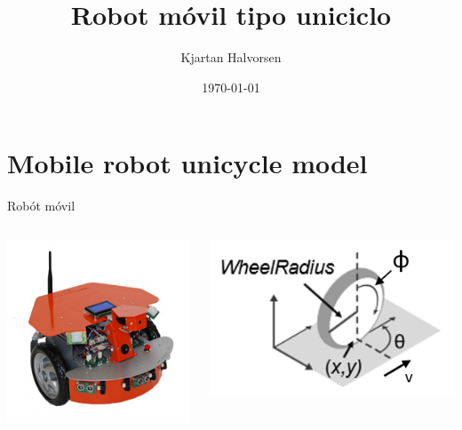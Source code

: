 \documentclass[presentation,aspectratio=169]{beamer}
\author{Kjartan Halvorsen}
\date{\today}
\title{Robot móvil tipo uniciclo}
\begin{document}
\maketitle

\section{Mobile robot unicycle model}
\label{sec:orgfd83bbd}

\begin{frame}[label={sec:org091a4ba}]{Robót móvil}
\begin{columns}
\begin{column}{0.4\columnwidth}
\begin{center}
 \includegraphics[width=.8\linewidth]{../figures/X80Pro.jpg}
\end{center}
\end{column}




\begin{column}{0.4\columnwidth}
\begin{center}
 \includegraphics[width=1.0\linewidth]{../figures/unicycle_annotated.png}
\end{center}
\end{column}
\end{columns}
\end{frame}
\end{document}
